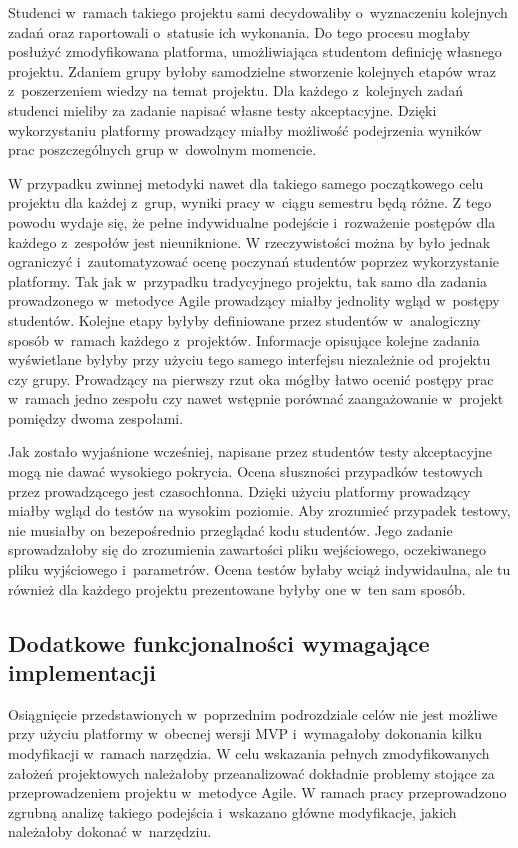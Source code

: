 Studenci w~ramach takiego projektu sami decydowaliby o~wyznaczeniu kolejnych zadań oraz raportowali o~statusie ich wykonania.
Do tego procesu mogłaby posłużyć zmodyfikowana platforma, umożliwiająca studentom definicję własnego projektu.
Zdaniem grupy byłoby samodzielne stworzenie kolejnych etapów wraz z~poszerzeniem wiedzy na temat projektu.
Dla każdego z~kolejnych zadań studenci mieliby za zadanie napisać własne testy akceptacyjne.
Dzięki wykorzystaniu platformy prowadzący miałby możliwość podejrzenia wyników prac poszczególnych grup w~dowolnym momencie.

W przypadku zwinnej metodyki nawet dla takiego samego początkowego celu projektu dla każdej z~grup, wyniki pracy w~ciągu semestru będą różne.
Z tego powodu wydaje się, że pełne indywidualne podejście i~rozważenie postępów dla każdego z~zespołów jest nieuniknione.
W rzeczywistości można by było jednak ograniczyć i~zautomatyzować ocenę poczynań studentów poprzez wykorzystanie platformy.
Tak jak w~przypadku tradycyjnego projektu, tak samo dla zadania prowadzonego w~metodyce Agile prowadzący miałby jednolity wgląd w~postępy studentów.
Kolejne etapy byłyby definiowane przez studentów w~analogiczny sposób w~ramach każdego z~projektów.
Informacje opisujące kolejne zadania wyświetlane byłyby przy użyciu tego samego interfejsu niezależnie od projektu czy grupy.
Prowadzący na pierwszy rzut oka mógłby łatwo ocenić postępy prac w~ramach jedno zespołu czy nawet wstępnie porównać zaangażowanie w~projekt pomiędzy dwoma zespołami.

Jak zostało wyjaśnione wcześniej, napisane przez studentów testy akceptacyjne mogą nie dawać wysokiego pokrycia.
Ocena słuszności przypadków testowych przez prowadzącego jest czasochłonna.
Dzięki użyciu platformy prowadzący miałby wgląd do testów na wysokim poziomie.
Aby zrozumieć przypadek testowy, nie musiałby on bezepośrednio przeglądać kodu studentów.
Jego zadanie sprowadzałoby się do zrozumienia zawartości pliku wejściowego, oczekiwanego pliku wyjściowego i~parametrów.
Ocena testów byłaby wciąż indywidaulna, ale tu również dla każdego projektu prezentowane byłyby one w~ten sam sposób.

\subsection{Dodatkowe funkcjonalności wymagające implementacji}
\label{agile_todo}

Osiągnięcie przedstawionych w~poprzednim podrozdziale celów nie jest możliwe przy użyciu platformy w~obecnej wersji MVP i~wymagałoby dokonania kilku modyfikacji w~ramach narzędzia.
W celu wskazania pełnych zmodyfikowanych założeń projektowych należałoby przeanalizować dokładnie problemy stojące za przeprowadzeniem projektu w~metodyce Agile.
W ramach pracy przeprowadzono zgrubną analizę takiego podejścia i~wskazano główne modyfikacje, jakich należałoby dokonać w~narzędziu.

